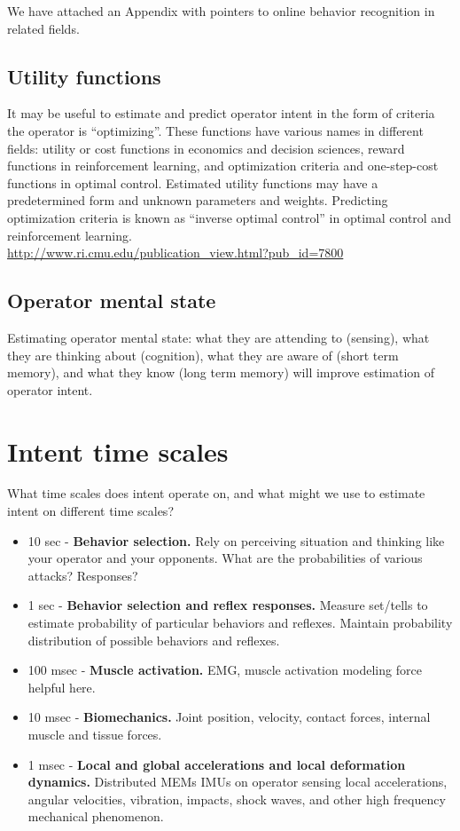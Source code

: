 \documentclass[letterpaper,12pt,fullpage]{article}
\begin{document}
We have attached an Appendix with pointers to online behavior
recognition in related fields.

\subsection{Utility functions}

It may be useful to estimate and predict operator intent in the form
of criteria the operator is ``optimizing''. These functions have
various names in different fields: utility or cost functions in economics
and decision sciences,
reward functions in reinforcement learning, and
optimization criteria and one-step-cost functions in optimal control.
Estimated utility functions may have a predetermined form and unknown
parameters and weights.
Predicting optimization criteria is known as ``inverse optimal control''
in optimal control and reinforcement learning.\\
\url{http://www.ri.cmu.edu/publication_view.html?pub_id=7800}

\subsection{Operator mental state}

Estimating operator mental state: what they are attending to (sensing),
what they are thinking about (cognition), what they are aware of (short term
memory), and what
they know (long term memory) will improve estimation of operator intent.

\section{Intent time scales}

What time scales does intent operate on, and what might we use
to estimate intent on different time scales?

\begin{itemize}
\item
10 sec - {\bf Behavior selection.}
Rely on perceiving situation and thinking like your operator and your
opponents.
What are the probabilities of various attacks? Responses?
\item
1 sec - {\bf Behavior selection and reflex responses.}
Measure set/tells to estimate probability of particular behaviors and reflexes.
Maintain probability distribution of possible behaviors and reflexes.
\item
100 msec - {\bf Muscle activation.} EMG, muscle activation modeling
force helpful here.
\item
10 msec - {\bf Biomechanics.} Joint position, velocity, contact forces,
internal muscle and tissue forces.
\item
1 msec - {\bf Local and global accelerations and local deformation dynamics.}
Distributed MEMs IMUs on operator sensing local accelerations,
angular velocities, vibration, impacts, shock waves, and other high
frequency mechanical phenomenon.
\end{itemize}
\end{document}
